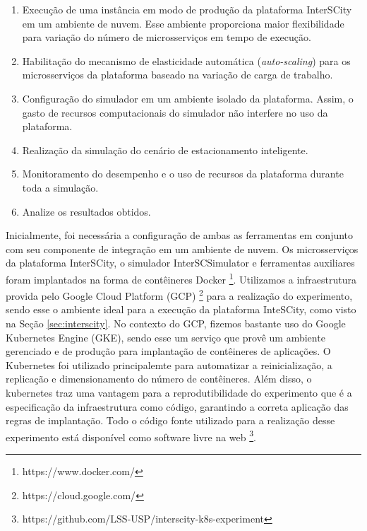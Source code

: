 \begin{enumerate}
    \item Execução de uma instância em modo de produção da plataforma InterSCity em um ambiente de nuvem. Esse ambiente proporciona maior flexibilidade para variação do número de microsserviços em tempo
        de execução.

    \item Habilitação do mecanismo de elasticidade automática (\textit{auto-scaling}) para os microsserviços da plataforma baseado na variação de carga de trabalho.

    \item Configuração do simulador em um ambiente isolado da plataforma. Assim, o gasto de recursos computacionais do simulador não interfere no uso da plataforma.

    \item Realização da simulação do cenário de estacionamento inteligente.

    \item Monitoramento do desempenho e o uso de recursos da plataforma durante toda a simulação.

    \item Analize os resultados obtidos.
\end{enumerate}

Inicialmente, foi necessária a configuração de ambas as ferramentas em conjunto com seu componente de integração em um ambiente de nuvem.
Os microsserviços da plataforma InterSCity, o simulador InterSCSimulator e ferramentas auxiliares foram implantados na forma de contêineres Docker \footnote{https://www.docker.com/}.
Utilizamos a infraestrutura provida pelo Google Cloud Platform (GCP) \footnote{https://cloud.google.com/} para a realização do experimento, sendo esse o ambiente ideal para a execução da plataforma
InteSCity, como visto na Seção \ref{sec:interscity}.
No contexto do GCP, fizemos bastante uso do Google Kubernetes Engine (GKE), sendo esse um serviço que provê um ambiente gerenciado e de produção para implantação de contêineres de
aplicações.
O Kubernetes foi utilizado principalemte para automatizar a reinicialização, a replicação e dimensionamento do número de contêineres.
Além disso, o kubernetes traz uma vantagem para a reprodutibilidade do experimento que é a especificação da infraestrutura como código, garantindo a correta aplicação das regras de implantação.
Todo o código fonte utilizado para a realização desse experimento está disponível como software livre na web \footnote{https://github.com/LSS-USP/interscity-k8s-experiment}.


